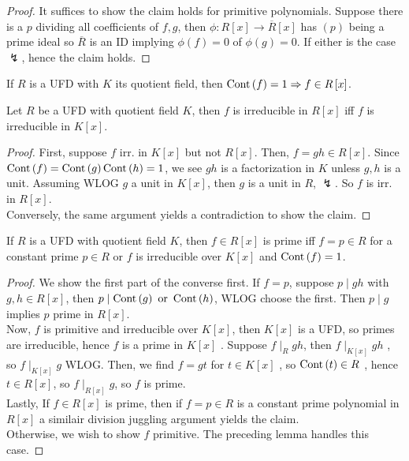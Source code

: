 \begin{proof}
	It suffices to show the claim holds for primitive polynomials. Suppose there is a \(p\) dividing all coefficients of \(f, g\), then \(\phi: R\left[ x \right]  \to \overline{R}\left[ x \right] \) has \(\left( p \right) \) being a prime ideal so \(\overline{R}\) is an ID implying \(\phi\left( f \right) = 0 \) of \(\phi\left( g \right)  = 0\). If either is the case \(\lightning\), hence the claim holds.
\end{proof}
\begin{proposition}
	If \(R\) is a UFD with \(K\) its quotient field, then \(\operatorname{Cont}\left( f \right) = 1 \Rightarrow f \in R\left[ x \right] \).
\end{proposition}
\begin{theorem}
	Let \(R\) be a UFD with quotient field \(K\), then \(f\) is irreducible in \(R\left[ x \right] \) iff \(f\) is irreducible in \(K\left[ x \right] \).
\end{theorem}
\begin{proof}
	First, suppose \(f\) irr. in \(K\left[ x \right] \) but not \(R\left[ x \right] \). Then, \(f = gh \in R\left[ x \right] \). Since \(\operatorname{Cont}\left( f \right) = \operatorname{Cont}\left( g \right) \operatorname{Cont}\left( h \right) = 1 \), we see \(gh\) is a factorization in \(K\) unless \(g, h\) is a unit. Assuming WLOG \(g\) a unit in \(K\left[ x \right] \), then \(g\) is a unit in \(R\), \(\lightning\). So \(f\) is irr. in \(R\left[ x \right] \).\\
	Conversely, the same argument yields a contradiction to show the claim.
\end{proof}
\begin{theorem}
	If \(R\) is a UFD with quotient field \(K\), then \(f\in R\left[ x \right] \) is prime iff \(f = p \in R\) for a constant prime \(p \in R\) or \(f\) is irreducible over \(K\left[ x \right] \) and \(\operatorname{Cont}\left( f \right) = 1\).
\end{theorem}
\begin{proof}
	We show the first part of the converse first. If \(f = p\), suppose \(p \mid gh\) with \(g, h \in R\left[ x \right] \), then \(p \mid \operatorname{Cont}\left( g \right) \text{ or } \operatorname{Cont}\left( h \right) \), WLOG choose the first. Then \(p \mid g\) implies \(p\) prime in \(R\left[ x \right] \).\\
	Now, \(f\) is primitive and irreducible over \(K\left[ x \right] \), then \(K\left[ x \right] \) is a UFD, so primes are irreducible, hence \(f\) is a prime in \(K\left[ x \right] \) . Suppose \(f \mid_{R} gh\), then \(f\mid_{K\left[ x \right] } gh\) , so \(f \mid_{K\left[ x \right] } g\) WLOG. Then, we find \(f = gt\) for \(t \in K\left[ x \right] \) , so \(\operatorname{Cont}\left( t \right) \in R\) , hence \(t \in R\left[ x \right] \), so \(f \mid_{R\left[ x \right] }g\), so \(f\) is prime.\\
	Lastly, If \(f \in R\left[ x \right] \) is prime, then if \(f= p \in R\) is a constant prime polynomial in \(R\left[ x \right] \) a similair division juggling argument yields the claim.\\
	Otherwise, we wish to show \(f\) primitive. The preceding lemma handles this case.
\end{proof}
